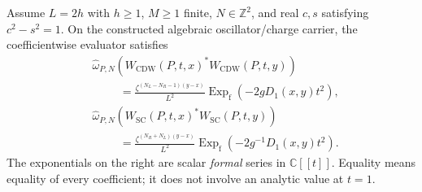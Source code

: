 \begin{theorem}
\label{thm:ch20b-correlators}
Assume \(L=2h\) with \(h\geq1\), \(M\geq1\) finite,
\(N\in\mathbb Z^2\), and real \(c,s\) satisfying \(c^2-s^2=1\).
On the constructed algebraic oscillator/charge carrier, the
coefficientwise evaluator satisfies
\begin{align}
 &\widehat\omega_{P,N}\!\left(
    W_{\mathrm{CDW}}(P,t,x)^*W_{\mathrm{CDW}}(P,t,y)\right)
 \nonumber\\[-2pt]
 &\hspace{1cm}=
 \frac{\zeta^{(N_L-N_R-1)(y-x)}}{L^2}
 \operatorname{Exp}_{\mathrm f}\!\left(-2gD_1(x,y)t^2\right),
 \label{eq:ch20b-cdw-corr}\\[4pt]
 &\widehat\omega_{P,N}\!\left(
    W_{\mathrm{SC}}(P,t,x)^*W_{\mathrm{SC}}(P,t,y)\right)
 \nonumber\\[-2pt]
 &\hspace{1cm}=
 \frac{\zeta^{(N_R+N_L)(y-x)}}{L^2}
 \operatorname{Exp}_{\mathrm f}\!\left(-2g^{-1}D_1(x,y)t^2\right).
 \label{eq:ch20b-sc-corr}
\end{align}
The exponentials on the right are scalar \emph{formal} series in
\(\mathbb C[[t]]\).  Equality means equality of every coefficient;
it does not involve an analytic value at \(t=1\).
\end{theorem}
